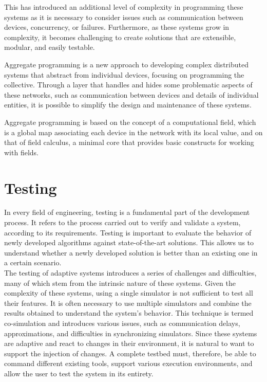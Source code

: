 \documentclass[12pt,a4paper,openright,twoside]{book}
\begin{document}
This has introduced an additional level of complexity in programming these systems as it is necessary to consider issues such as communication between devices,
concurrency, or failures. Furthermore, as these systems grow in complexity, it becomes challenging to create solutions that are extensible, modular, and easily testable. \cite{DBLP:conf/ecoop/CasadeiV16}

Aggregate programming is a new approach to developing complex distributed systems that abstract from individual devices, focusing on programming the collective.
Through a layer that handles and hides some problematic aspects of these networks, such as communication between devices and details of individual entities,
it is possible to simplify the design and maintenance of these systems. \cite{DBLP:journals/computer/BealPV15, DBLP:conf/sfm/BealV16}

Aggregate programming is based on the concept of a computational field, which is a global map associating each device in the network with its local value,
and on that of field calculus, a minimal core that provides basic constructs for working with fields. \cite{DBLP:journals/corr/ViroliADPB16}

\section{Testing}

In every field of engineering, testing is a fundamental part of the development process. 
It refers to the process carried out to verify and validate a system, according to its requirements. \cite{Spillner2011}
Testing is important to evaluate the behavior of newly developed algorithms against state-of-the-art solutions.
This allows us to understand whether a newly developed solution is better than an existing one in a certain scenario. \\

The testing of adaptive systems introduces a series of challenges and difficulties, many of which stem from the intrinsic nature of these systems.
Given the complexity of these systems, using a single simulator is not sufficient to test all their features.
It is often necessary to use multiple simulators and combine the results obtained to understand the system's behavior.
This technique is termed co-simulation and introduces various issues, such as communication delays, approximations, and difficulties in synchronizing simulators. \cite{DBLP:journals/simpra/ThuleLGML19}
Since these systems are adaptive and react to changes in their environment, it is natural to want to support the injection of changes. \cite{DBLP:conf/icac/BrownHHLLSY04}
A complete testbed must, therefore, be able to command different existing tools, support various execution environments, and allow the user to test the system in its entirety.
\end{document}

